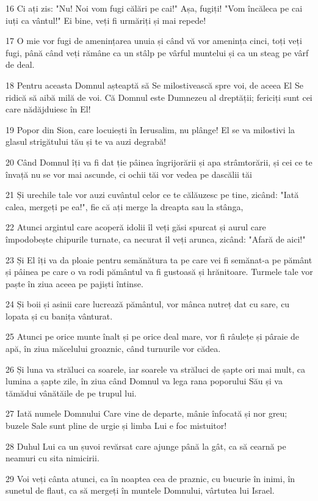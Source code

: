 \par 16 Ci ați zis: "Nu! Noi vom fugi călări pe cai!" Așa, fugiți! "Vom încăleca pe cai iuți ca vântul!" Ei bine, veți fi urmăriți și mai repede!
\par 17 O mie vor fugi de amenințarea unuia și când vă vor amenința cinci, toți veți fugi, până când veți rămâne ca un stâlp pe vârful muntelui și ca un steag pe vârf de deal.
\par 18 Pentru aceasta Domnul așteaptă să Se milostivească spre voi, de aceea El Se ridică să aibă milă de voi. Că Domnul este Dumnezeu al dreptății; fericiți sunt cei care nădăjduiesc în El!
\par 19 Popor din Sion, care locuiești în Ierusalim, nu plânge! El se va milostivi la glasul strigătului tău și te va auzi degrabă!
\par 20 Când Domnul îți va fi dat ție pâinea îngrijorării și apa strâmtorării, și cei ce te învață nu se vor mai ascunde, ci ochii tăi vor vedea pe dascălii tăi
\par 21 Și urechile tale vor auzi cuvântul celor ce te călăuzesc pe tine, zicând: "Iată calea, mergeți pe ea!", fie că ați merge la dreapta sau la stânga,
\par 22 Atunci argintul care acoperă idolii îl veți găsi spurcat și aurul care împodobește chipurile turnate, ca necurat îl veți arunca, zicând: "Afară de aici!"
\par 23 Și El îți va da ploaie pentru semănătura ta pe care vei fi semănat-a pe pământ și pâinea pe care o va rodi pământul va fi gustoasă și hrănitoare. Turmele tale vor paște în ziua aceea pe pajiști întinse.
\par 24 Și boii și asinii care lucrează pământul, vor mânca nutreț dat cu sare, cu lopata și cu banița vânturat.
\par 25 Atunci pe orice munte înalt și pe orice deal mare, vor fi râulețe și pâraie de apă, în ziua măcelului groaznic, când turnurile vor cădea.
\par 26 Și luna va străluci ca soarele, iar soarele va străluci de șapte ori mai mult, ca lumina a șapte zile, în ziua când Domnul va lega rana poporului Său și va tămădui vânătăile de pe trupul lui.
\par 27 Iată numele Domnului Care vine de departe, mânie înfocată și nor greu; buzele Sale sunt pline de urgie și limba Lui e foc mistuitor!
\par 28 Duhul Lui ca un șuvoi revărsat care ajunge până la gât, ca să cearnă pe neamuri cu sita nimicirii.
\par 29 Voi veți cânta atunci, ca în noaptea cea de praznic, cu bucurie în inimi, în sunetul de flaut, ca să mergeți în muntele Domnului, vârtutea lui Israel.
